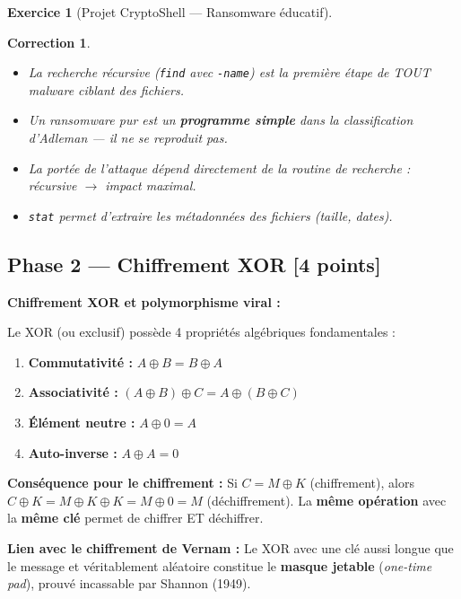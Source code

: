 \documentclass[a4paper,11pt]{article}
\theoremstyle{plain}
\newtheorem{correction}{Correction}
\theoremstyle{definition}
\newtheorem{exercice}{Exercice}
\begin{document}
\begin{exercice}[Projet CryptoShell --- Ransomware éducatif]
\begin{correction}
\begin{pointcle}
\begin{itemize}
    \item La recherche récursive (\texttt{find} avec \texttt{-name}) est la première étape de TOUT malware ciblant des fichiers.
    \item Un ransomware pur est un \textbf{programme simple} dans la classification d'Adleman --- il ne se reproduit pas.
    \item La portée de l'attaque dépend directement de la routine de recherche : récursive $\to$ impact maximal.
    \item \texttt{stat} permet d'extraire les métadonnées des fichiers (taille, dates).
\end{itemize}
\end{pointcle}

\end{correction}



\subsection*{Phase 2 --- Chiffrement XOR \hfill \normalsize [4 points]}

\begin{rappel}
\textbf{Chiffrement XOR et polymorphisme viral :}

Le XOR (ou exclusif) possède 4 propriétés algébriques fondamentales :
\begin{enumerate}
    \item \textbf{Commutativité :} $A \oplus B = B \oplus A$
    \item \textbf{Associativité :} $(A \oplus B) \oplus C = A \oplus (B \oplus C)$
    \item \textbf{Élément neutre :} $A \oplus 0 = A$
    \item \textbf{Auto-inverse :} $A \oplus A = 0$
\end{enumerate}

\medskip
\textbf{Conséquence pour le chiffrement :} Si $C = M \oplus K$ (chiffrement), alors $C \oplus K = M \oplus K \oplus K = M \oplus 0 = M$ (déchiffrement). La \textbf{même opération} avec la \textbf{même clé} permet de chiffrer ET déchiffrer.

\medskip
\textbf{Lien avec le chiffrement de Vernam :} Le XOR avec une clé aussi longue que le message et véritablement aléatoire constitue le \textbf{masque jetable} (\textit{one-time pad}), prouvé incassable par Shannon (1949).


\end{rappel}
\end{exercice}
\end{document}
